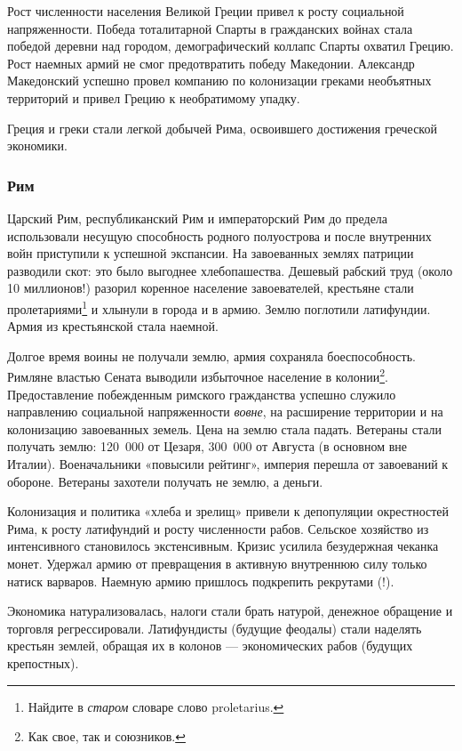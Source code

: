 Рост численности населения Великой Греции привел к росту социальной напряженности. Победа тоталитарной Спарты в
гражданских войнах стала победой деревни над городом, демографический коллапс Спарты охватил Грецию. Рост наемных армий
не смог предотвратить победу Македонии. Александр Македонский успешно провел компанию по колонизации греками необъятных
территорий и привел Грецию к необратимому упадку.

Греция и греки стали легкой добычей Рима, освоившего достижения греческой экономики.

\subsubsection[Рим ]{Рим }
Царский Рим, республиканский Рим и императорский Рим до предела использовали несущую способность родного полуострова и после внутренних войн приступили к успешной экспансии. На завоеванных землях патриции разводили скот: это было
выгоднее хлебопашества. Дешевый рабский труд (около 10 миллионов!) разорил коренное население завоевателей, крестьяне
стали пролетариями\footnote{Найдите в \textit{старом} словаре слово
\foreignlanguage{english}{proletarius}.} и хлынули в города и в армию. Землю поглотили латифундии. Армия из
крестьянской стала наемной.

Долгое время воины не получали землю, армия сохраняла боеспособность. Римляне властью Сената выводили избыточное
население в колонии\footnote{Как свое, так и союзников.}. Предоставление побежденным римского
гражданства успешно служило направлению социальной напряженности \textit{вовне}, на расширение территории и на
колонизацию завоеванных земель. Цена на землю стала падать. Ветераны стали получать землю: 120~000 от Цезаря, 300~000
от Августа (в основном вне Италии). Военачальники «повысили рейтинг», империя перешла от завоеваний к обороне. Ветераны
захотели получать не землю, а деньги.


Колонизация и политика «хлеба и зрелищ» привели к депопуляции окрестностей Рима, к росту латифундий и росту численности
рабов. Сельское хозяйство из интенсивного становилось экстенсивным. Кризис усилила безудержная чеканка монет. Удержал
армию от превращения в активную внутреннюю силу только натиск варваров. Наемную армию пришлось подкрепить рекрутами
(!).


Экономика натурализовалась, налоги стали брать натурой, денежное обращение и торговля регрессировали. Латифундисты
(будущие феодалы) стали наделять крестьян землей, обращая их в колонов — экономических рабов (будущих крепостных).


